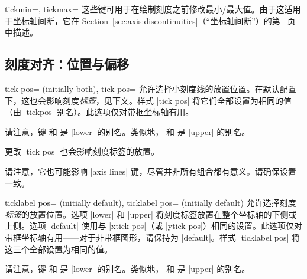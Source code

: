 \begin{pgfplotsxykeylist}{\x tickmin=, \x tickmax=}
    这些键可用于在绘制刻度之前修改最小/最大值。由于这适用于坐标轴间断，它在 Section~\ref{sec:axis:discontinuities}（“坐标轴间断”）的第~\pageref{key:xytickminmax} 页中描述。
\end{pgfplotsxykeylist}


\subsection{刻度对齐：位置与偏移}

\begin{pgfplotsxykeylist}{%
    \x tick pos= (initially both),
    tick pos=%
}
    允许选择小刻度线的放置位置。在默认配置下，这也会影响刻度\emph{标签}，见下文。样式 |tick pos| 将它们全部设置为相同的值（由 |tickpos| 别名）。此选项仅对带框坐标轴有用。

    请注意，键  和  是 |lower| 的别名。类似地， 和  是 |upper| 的别名。

    更改 |tick pos| 也会影响刻度标签的放置。

    请注意，它也可能影响 |axis lines| 键，尽管并非所有组合都有意义。请确保设置一致。
\end{pgfplotsxykeylist}

\begin{pgfplotsxykeylist}{%
    \x ticklabel pos= (initially default),
       ticklabel pos= (initially default)%
}
    允许选择刻度\emph{标签}的放置位置。选项 |lower| 和 |upper| 将刻度标签放置在整个坐标轴的下侧或上侧。选项 |default| 使用与 |xtick pos|（或 |ytick pos|）相同的设置。此选项仅对带框坐标轴有用——对于非带框图形，请保持为 |default|。样式 |ticklabel pos| 将这三个全部设置为相同的值。

    请注意，键  和  是 |lower| 的别名。类似地， 和  是 |upper| 的别名。
\end{pgfplotsxykeylist}

